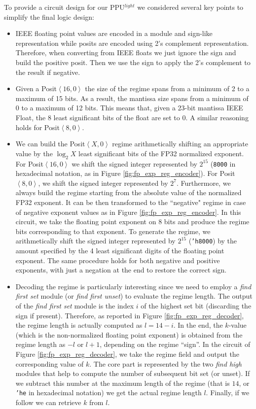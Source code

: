 To provide a circuit design for our PPU$^{light}$ we considered several key points to simplify the final logic design:
\begin{itemize}
    \item IEEE floating point values are encoded in a module and sign-like representation while posits are encoded using 2's complement representation. Therefore, when converting from IEEE floats we just ignore the sign and build the positive posit. Then we use the sign to apply the 2's complement to the result if negative.
    \item Given a Posit$\left<16,0\right>$ the size of the regime spans from a minimum of 2 to a maximum of 15 bits. As a result, the mantissa size spans from a minimum of 0 to a maximum of 12 bits. This means that, given a 23-bit mantissa IEEE Float, the 8 least significant bits of the float are set to 0. A similar reasoning holds for Posit$\left<8,0\right>$. 
    \item We can build the Posit$\left<X,0\right>$ regime arithmetically shifting an appropriate value by the $\log_2{X}$ least significant bits of the FP32 normalized exponent. For Posit$\left<16,0\right>$ we shift the signed integer represented by $2^{15}$ (\texttt{8000} in hexadecimal notation, as in Figure \ref{fig:fp_exp_reg_encoder}). For Posit$\left<8,0\right>$, we shift the signed integer represented by $2^{7}$. Furthermore, we always build the regime starting from the absolute value of the normalized FP32 exponent. It can be then transformed to the ``negative" regime in case of negative exponent values as in Figure \ref{fig:fp_exp_reg_encoder}. In this circuit, we take the floating point exponent on 8 bits and produce the regime bits corresponding to that exponent. To generate the regime, we arithmetically shift the signed integer represented by $2^{15}$ (\texttt{'h8000}) by the amount specified by the 4 least significant digits of the floating point exponent. The same procedure holds for both negative and positive exponents, with just a negation at the end to restore the correct sign. 
    \item Decoding the regime is particularly interesting since we need to employ a \emph{find first set} module (or \emph{find first unset}) to evaluate the regime length. The output of the \emph{find first set} module is the index $i$ of the highest set bit (discarding the sign if present). Therefore, as reported in Figure \ref{fig:fp_exp_reg_decoder}, the regime length is actually computed as $l=14-i$. In the end, the $k$-value (which is the non-normalized floating point exponent) is obtained from the regime length as $-l$ or $l+1$, depending on the regime ``sign''. In the circuit of Figure \ref{fig:fp_exp_reg_decoder}, we take the regime field and output the corresponding value of $k$. The core part is represented by the two \textit{find high} modules that help to compute the number of subsequent bit set (or unset). If we subtract this number at the maximum length of the regime (that is $14$, or \texttt{'he} in hexadecimal notation) we get the actual regime length $l$. Finally, if we follow we can retrieve $k$ from $l$.  
\end{itemize}

